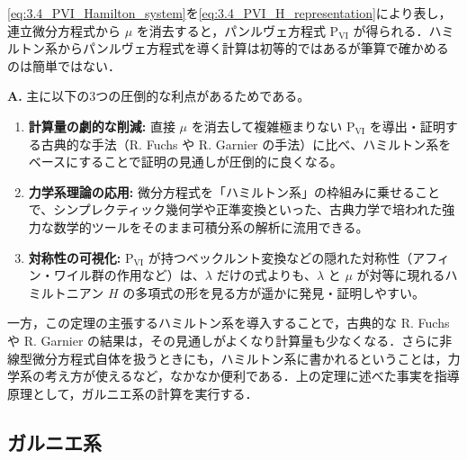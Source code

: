 \eqref{eq:3.4_PVI_Hamilton_system}を\eqref{eq:3.4_PVI_H_representation}により表し，連立微分方程式から $\mu$ を消去すると，パンルヴェ方程式 $\mathrm{P}_{\mathrm{VI}}$ が得られる．ハミルトン系からパンルヴェ方程式を導く計算は初等的ではあるが筆算で確かめるのは簡単ではない．

\begin{Q}
\textbf{A.} 主に以下の3つの圧倒的な利点があるためである。
\begin{enumerate}
    \item \textbf{計算量の劇的な削減:} 直接 $\mu$ を消去して複雑極まりない $\mathrm{P}_{\mathrm{VI}}$ を導出・証明する古典的な手法（R. Fuchs や R. Garnier の手法）に比べ、ハミルトン系をベースにすることで証明の見通しが圧倒的に良くなる。
    \item \textbf{力学系理論の応用:} 微分方程式を「ハミルトン系」の枠組みに乗せることで、シンプレクティック幾何学や正準変換といった、古典力学で培われた強力な数学的ツールをそのまま可積分系の解析に流用できる。
    \item \textbf{対称性の可視化:} $\mathrm{P}_{\mathrm{VI}}$ が持つベックルント変換などの隠れた対称性（アフィン・ワイル群の作用など）は、$\lambda$ だけの式よりも、$\lambda$ と $\mu$ が対等に現れるハミルトニアン $H$ の多項式の形を見る方が遥かに発見・証明しやすい。
\end{enumerate}
\end{Q}

一方，この定理の主張するハミルトン系を導入することで，古典的な R. Fuchs や R. Garnier の結果は，その見通しがよくなり計算量も少なくなる．さらに非線型微分方程式自体を扱うときにも，ハミルトン系に書かれるということは，力学系の考え方が使えるなど，なかなか便利である．上の定理に述べた事実を指導原理として，ガルニエ系の計算を実行する．

\subsection{ガルニエ系}

